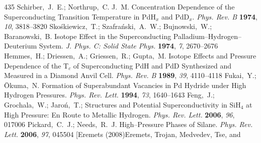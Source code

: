 \documentclass[12pt,letterpaper,oneside]{article}
\begin{document}
\begin{mcitethebibliography}{435}
Schirber,~J.~E.; Northrup,~C. J.~M. Concentration Dependence of the
  Superconducting Transition Temperature in PdH$_x$ and PdD$_x$. \emph{Phys.
  Rev. B} \textbf{1974}, \emph{10}, 3818--3820\relax
\mciteBstWouldAddEndPuncttrue
\mciteSetBstMidEndSepPunct{\mcitedefaultmidpunct}
{\mcitedefaultendpunct}{\mcitedefaultseppunct}\relax
\EndOfBibitem
{}
Sko{\'s}kiewicz,~T.; Szafra{\'n}ski,~A.~W.; Bujnowski,~W.; Baranowski,~B.
  Isotope Effect in the Superconducting Palladium--Hydrogen--Deuterium System.
  \emph{J. Phys. C: Solid State Phys.} \textbf{1974}, \emph{7},
  2670--2676\relax
\mciteBstWouldAddEndPuncttrue
\mciteSetBstMidEndSepPunct{\mcitedefaultmidpunct}
{\mcitedefaultendpunct}{\mcitedefaultseppunct}\relax
\EndOfBibitem
{}
Hemmes,~H.; Driessen,~A.; Griessen,~R.; Gupta,~M. Isotope Effects and Pressure
  Dependence of the T$_c$ of Superconducting PdH and PdD Synthesized and
  Measured in a Diamond Anvil Cell. \emph{Phys. Rev. B} \textbf{1989},
  \emph{39}, 4110--4118\relax
\mciteBstWouldAddEndPuncttrue
\mciteSetBstMidEndSepPunct{\mcitedefaultmidpunct}
{\mcitedefaultendpunct}{\mcitedefaultseppunct}\relax
\EndOfBibitem
{}
Fukai,~Y.; {\= O}kuma,~N. Formation of Superabundant Vacancies in Pd Hydride
  under High Hydrogen Pressures. \emph{Phys. Rev. Lett.} \textbf{1994},
  \emph{73}, 1640--1643\relax
\mciteBstWouldAddEndPuncttrue
\mciteSetBstMidEndSepPunct{\mcitedefaultmidpunct}
{\mcitedefaultendpunct}{\mcitedefaultseppunct}\relax
\EndOfBibitem
{}
Feng,~J.; Grochala,~W.; Jaro{\'n},~T.; 
   Structures and Potential Superconductivity in SiH$_4$ at High Pressure: En
  Route to Metallic Hydrogen. \emph{Phys. Rev. Lett.} \textbf{2006}, \emph{96},
  017006\relax
\mciteBstWouldAddEndPuncttrue
\mciteSetBstMidEndSepPunct{\mcitedefaultmidpunct}
{\mcitedefaultendpunct}{\mcitedefaultseppunct}\relax
\EndOfBibitem
{}
Pickard,~C.~J.; Needs,~R.~J. High--Pressure Phases of Silane. \emph{Phys. Rev.
  Lett.} \textbf{2006}, \emph{97}, 045504\relax
\mciteBstWouldAddEndPuncttrue
\mciteSetBstMidEndSepPunct{\mcitedefaultmidpunct}
{\mcitedefaultendpunct}{\mcitedefaultseppunct}\relax
\EndOfBibitem
\bibitem[Eremets (2008)Eremets, Trojan, Medvedev, Tse, and

\end{mcitethebibliography}
\end{document}
